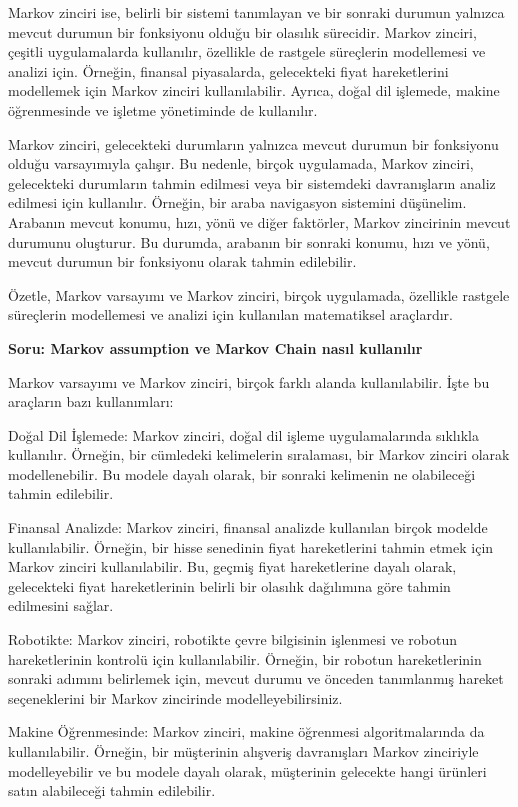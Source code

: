 \documentclass[11pt]{article}
\begin{document}
Markov zinciri ise, belirli bir sistemi tanımlayan ve bir sonraki durumun yalnızca mevcut durumun bir fonksiyonu olduğu bir olasılık sürecidir. Markov zinciri, çeşitli uygulamalarda kullanılır, özellikle de rastgele süreçlerin modellemesi ve analizi için. Örneğin, finansal piyasalarda, gelecekteki fiyat hareketlerini modellemek için Markov zinciri kullanılabilir. Ayrıca, doğal dil işlemede, makine öğrenmesinde ve işletme yönetiminde de kullanılır.

Markov zinciri, gelecekteki durumların yalnızca mevcut durumun bir fonksiyonu olduğu varsayımıyla çalışır. Bu nedenle, birçok uygulamada, Markov zinciri, gelecekteki durumların tahmin edilmesi veya bir sistemdeki davranışların analiz edilmesi için kullanılır. Örneğin, bir araba navigasyon sistemini düşünelim. Arabanın mevcut konumu, hızı, yönü ve diğer faktörler, Markov zincirinin mevcut durumunu oluşturur. Bu durumda, arabanın bir sonraki konumu, hızı ve yönü, mevcut durumun bir fonksiyonu olarak tahmin edilebilir.

Özetle, Markov varsayımı ve Markov zinciri, birçok uygulamada, özellikle rastgele süreçlerin modellemesi ve analizi için kullanılan matematiksel araçlardır.

\textbf{Soru: Markov assumption ve Markov Chain nasıl kullanılır}

Markov varsayımı ve Markov zinciri, birçok farklı alanda kullanılabilir. İşte bu araçların bazı kullanımları:

Doğal Dil İşlemede: Markov zinciri, doğal dil işleme uygulamalarında sıklıkla kullanılır. Örneğin, bir cümledeki kelimelerin sıralaması, bir Markov zinciri olarak modellenebilir. Bu modele dayalı olarak, bir sonraki kelimenin ne olabileceği tahmin edilebilir.

Finansal Analizde: Markov zinciri, finansal analizde kullanılan birçok modelde kullanılabilir. Örneğin, bir hisse senedinin fiyat hareketlerini tahmin etmek için Markov zinciri kullanılabilir. Bu, geçmiş fiyat hareketlerine dayalı olarak, gelecekteki fiyat hareketlerinin belirli bir olasılık dağılımına göre tahmin edilmesini sağlar.

Robotikte: Markov zinciri, robotikte çevre bilgisinin işlenmesi ve robotun hareketlerinin kontrolü için kullanılabilir. Örneğin, bir robotun hareketlerinin sonraki adımını belirlemek için, mevcut durumu ve önceden tanımlanmış hareket seçeneklerini bir Markov zincirinde modelleyebilirsiniz.

Makine Öğrenmesinde: Markov zinciri, makine öğrenmesi algoritmalarında da kullanılabilir. Örneğin, bir müşterinin alışveriş davranışları Markov zinciriyle modelleyebilir ve bu modele dayalı olarak, müşterinin gelecekte hangi ürünleri satın alabileceği tahmin edilebilir.
\end{document}
